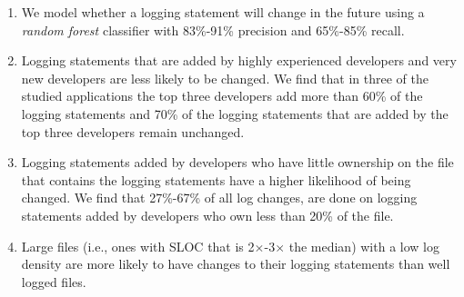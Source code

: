 \begin{enumerate}
	\item We model whether a logging statement will change in the future using a \emph{random forest} classifier with 83\%-91\% precision and 65\%-85\% recall. 


	\item Logging statements that are added by highly experienced developers and very new developers are less likely to be changed. We find that in three of the studied applications the top three developers add more than 60\% of the logging statements and 70\% of the logging statements that are added by the top three developers remain unchanged. 
	
	\item Logging statements added by developers who have little ownership on the file that contains the logging statements have a higher likelihood of being changed. We find that 27\%-67\% of all log changes, are done on logging statements added by developers who own less than 20\% of the file.
 
	
	
	
	\item Large files (i.e., ones with SLOC that is 2$\times$-3$\times$ the median) with a low log density are more likely to have changes to their logging statements than well logged files.


\end{enumerate}

